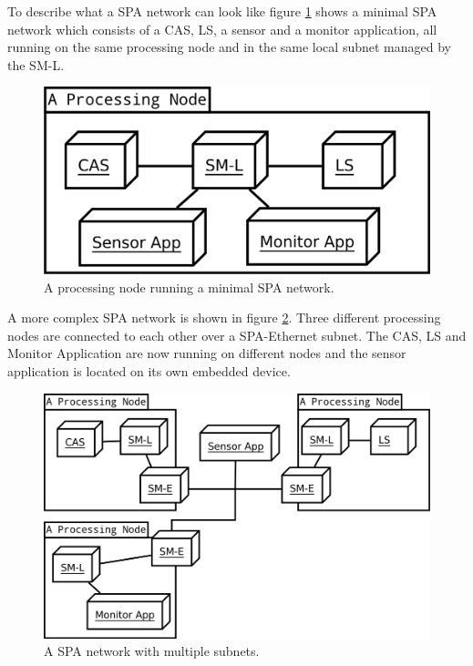 To describe what a SPA network can look like figure
\ref{fig:minimal_spa_network} shows a minimal SPA network which consists of a
CAS, LS, a sensor and a monitor application, all running on the same processing
node and in the same local subnet managed by the SM-L.

\begin{figure}[h]
    \centering
    \includegraphics[width=\textwidth]{figures/minimal_spa_network}
    \caption{A processing node running a minimal SPA network.}
    \label{fig:minimal_spa_network}
\end{figure}

A more complex SPA network is shown in figure \ref{fig:complex_spa_network}.
Three different processing nodes are connected to each other over a
SPA-Ethernet subnet. The CAS, LS and Monitor Application are now running on
different nodes and the sensor application is located on its own embedded
device.

\begin{figure}[h]
    \centering
    \includegraphics[width=\textwidth]{figures/complex_spa_network}
    \caption{A SPA network with multiple subnets.}
    \label{fig:complex_spa_network}
\end{figure}

